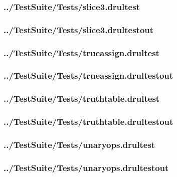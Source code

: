 \begin{changemargin}{-1in}{-1in}
\subsubsection{../TestSuite/Tests/slice3.drultest}


\subsubsection{../TestSuite/Tests/slice3.drultestout}


\subsubsection{../TestSuite/Tests/trueassign.drultest}


\subsubsection{../TestSuite/Tests/trueassign.drultestout}


\subsubsection{../TestSuite/Tests/truthtable.drultest}


\subsubsection{../TestSuite/Tests/truthtable.drultestout}


\subsubsection{../TestSuite/Tests/unaryops.drultest}


\subsubsection{../TestSuite/Tests/unaryops.drultestout}



\end{changemargin}
